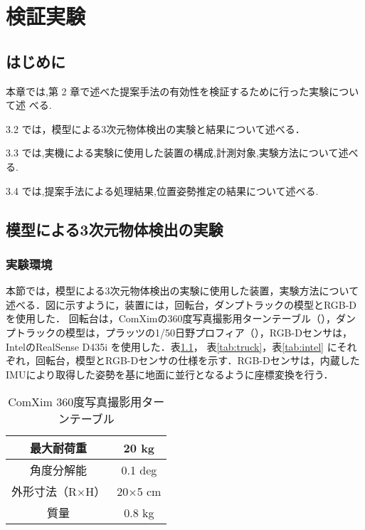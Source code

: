 \chapter{検証実験}
\thispagestyle{empty}
\label{chap3}
\minitoc

\newpage
\section{はじめに}
本章では,第 2 章で述べた提案手法の有効性を検証するために行った実験について述
べる.
\par
3.2 では，模型による3次元物体検出の実験と結果について述べる．
\par
3.3 では,実機による実験に使用した装置の構成,計測対象,実験方法について述べる.
\par
3.4 では,提案手法による処理結果,位置姿勢推定の結果について述べる.
\newpage

\section{模型による3次元物体検出の実験}
\subsection{実験環境}
本節では，模型による3次元物体検出の実験に使用した装置，実験方法について述べる．図に示すように，装置には，回転台，ダンプトラックの模型とRGB-Dを使用した．
回転台は，ComXimの360度写真撮影用ターンテーブル（），ダンプトラックの模型は，プラッツの1/50日野プロフィア（），RGB-Dセンサは，IntelのRealSense D435i を使用した．表\ref{tab:table}，
表\ref{tab:truck}，表\ref{tab:intel}
にそれぞれ，回転台，模型とRGB-Dセンサの仕様を示す．RGB-Dセンサは，内蔵したIMUにより取得した姿勢を基に地面に並行となるように座標変換を行う．



\begin{table}[b]
    \begin{center}
    \caption{ComXim 360度写真撮影用ターンテーブル}
    \begin{tabular}{|c|c|}
    \hline
    最大耐荷重     & 20 kg   \\ \hline
    角度分解能     & 0.1 deg \\ \hline
    外形寸法（R×H） & 20×5 cm \\ \hline
    質量        & 0.8 kg  \\ \hline
       \end{tabular}
    \label{tab:table}
    \end{center}
\end{table}

